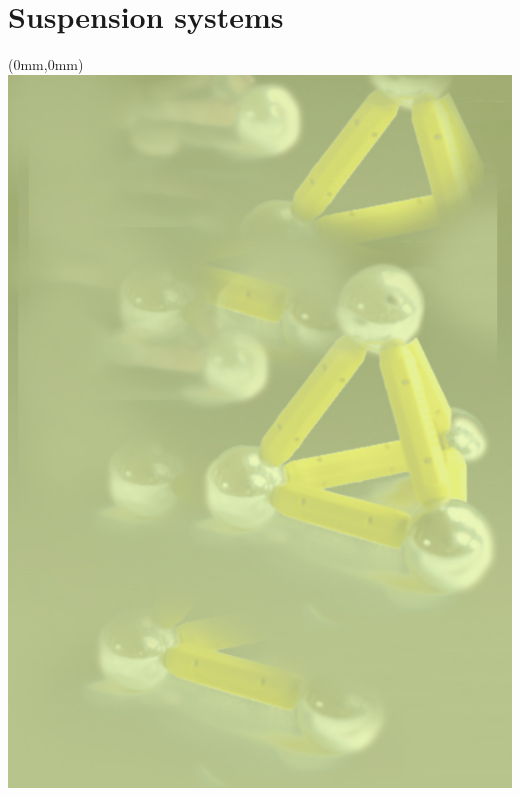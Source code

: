 \documentclass[color,DIV12,pdftex,a4paper]{ET-DS}
\begin{document}
\section{Suspension systems} \label{sec:suspension_systems}

%
%
\cleardoublepage
\FloatBarrier
%
\begin{textblock*}{297mm}(0mm,0mm)   \includegraphics[width=\paperwidth]{Sec_Optics/OpticsFirstPage.jpg}
\end{textblock*}
%
\end{document}
